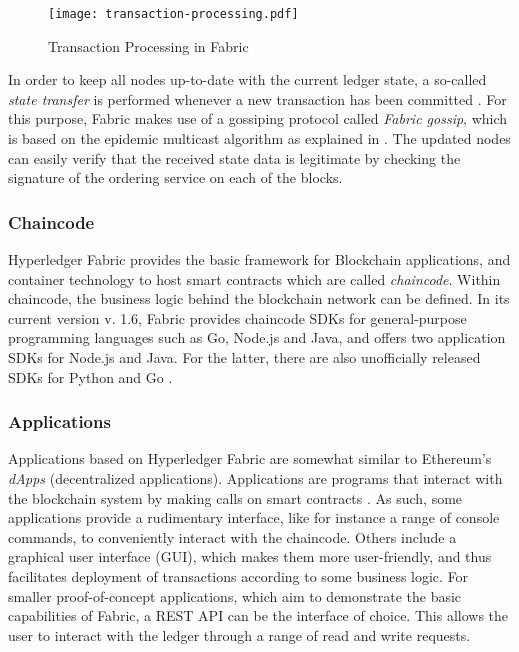\begin{figure}[ht]
	\centering
	\texttt{[image: transaction-processing.pdf]}
	\caption{Transaction Processing in Fabric}
	\label{fig:transaction-processing}
	\vspace{-3mm} %
\end{figure}

In order to keep all nodes up-to-date with the current ledger state, a so-called \textit{state transfer} is performed whenever a new transaction has been committed \cite[p. 9]{Androulaki2018}. For this purpose, Fabric makes use of a gossiping protocol called \textit{Fabric gossip}, which is based on the epidemic multicast algorithm as explained in \cite{Demers1987}. The updated nodes can easily verify that the received state data is legitimate by checking the signature of the ordering service on each of the blocks. 

\subsubsection{Chaincode}
Hyperledger Fabric provides the basic framework for Blockchain applications, and container technology to host smart contracts which are called \textit{chaincode}. Within chaincode, the business logic behind the blockchain network can be defined. In its current version v. 1.6, Fabric provides chaincode SDKs for general-purpose programming languages such as Go, Node.js and Java, and offers two application SDKs for Node.js and Java. For the latter, there are also unofficially released SDKs for Python and Go \cite{HyperledgerDocs} \cite{Yamashita2019}. 

\subsubsection{Applications}
Applications based on Hyperledger Fabric are somewhat similar to Ethereum's \textit{dApps} (decentralized applications). Applications are programs that interact with the blockchain system by making calls on smart contracts \cite{Gaski2019}. As such, some applications provide a rudimentary interface, like for instance a range of console commands, to conveniently interact with the chaincode. Others include a graphical user interface (GUI), which makes them more user-friendly, and thus facilitates deployment of transactions according to some business logic. For smaller proof-of-concept applications, which aim to demonstrate the basic capabilities of Fabric, a REST API can be the interface of choice. 
This allows the user to interact with the ledger through a range of read and write requests.  

